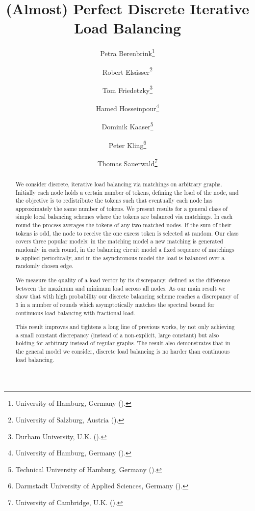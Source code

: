 \documentclass[twoside,leqno]{article}
\DeclareMathOperator{\1}{\mathbf{1}}
\numberwithin{equation}{section}
\begin{document}
\title{\Large (Almost) Perfect Discrete Iterative Load Balancing}

\author{
    Petra Berenbrink\thanks{University of Hamburg, Germany (). 
    }
    \and Robert Els\"asser\thanks{University of Salzburg, Austria ().}
    \and Tom Friedetzky\thanks{Durham University, U.K. ().}
    \and Hamed Hosseinpour\thanks{University of Hamburg, Germany ().}
    \and Dominik Kaaser\thanks{Technical University of Hamburg, Germany ().}
    \and Peter Kling\thanks{Darmstadt University of Applied Sciences, Germany ().}
    \and Thomas Sauerwald\thanks{University of Cambridge, U.K. ().}
}

\date{}

\maketitle

\fancyfoot[C]{\thepage}


\begin{abstract}
We consider discrete, iterative load balancing via matchings on arbitrary
graphs. Initially each node holds a certain number of tokens, defining the load
of the node, and the objective is to redistribute the tokens such that
eventually each node has approximately the same number of tokens. We present
results for a general class of simple local balancing schemes where the
tokens are balanced via matchings. In each round the process averages the
tokens of any two matched nodes. If the sum of their tokens is odd, the node to
receive the one excess token is selected at random. Our class covers three
popular models: in the matching model a new matching is generated randomly in
each round, in the balancing circuit model a fixed sequence of matchings is
applied periodically, and in the asynchronous model the load is balanced over a
randomly chosen edge.

We measure the quality of a load vector by its discrepancy, defined as the
difference between the maximum and minimum load across all nodes. As our main
result we show that with high probability our discrete balancing scheme reaches
a discrepancy of $3$ in a number of rounds which asymptotically matches the spectral bound for continuous load balancing with fractional load.

This result improves and tightens a long line of previous works, by not only
achieving a small constant discrepancy (instead of a non-explicit, large
constant) but also holding for arbitrary instead of regular graphs. The result
also demonstrates that in the general model we consider, discrete load
balancing is no harder than continuous load balancing.
\end{abstract}
\end{document}
